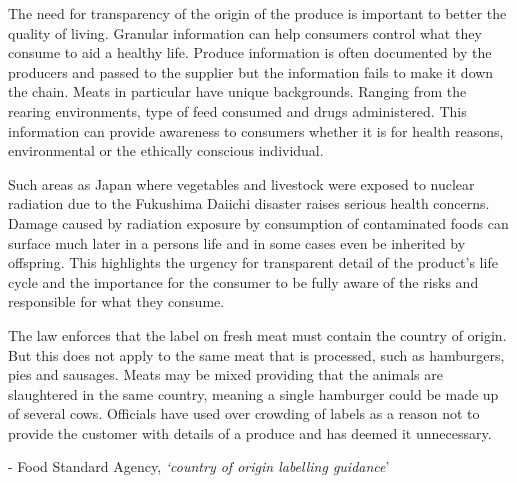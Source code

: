 \documentclass[a4paper, 11pt]{article}
\begin{document}
The need for transparency of the origin of the produce is important to better the quality of living. Granular information can help consumers control what they consume to aid a healthy life. Produce information is often documented by the producers and passed to the supplier but the information fails to make it down the chain.\cite{FSA} Meats in particular have unique backgrounds. Ranging from the rearing environments, type of feed consumed and drugs administered. This information can provide awareness to consumers whether it is for health reasons, environmental or the ethically conscious individual.

Such areas as Japan where vegetables and livestock were exposed to nuclear radiation due to the Fukushima Daiichi disaster raises serious health concerns. Damage caused by radiation exposure by consumption of contaminated foods can surface much later in a persons life and in some cases even be inherited by offspring. This highlights the urgency for transparent detail of the product's life cycle and the importance for the consumer to be fully aware of the risks and responsible for what they consume.\cite{fukushima}

The law enforces that the label on fresh meat must contain the country of origin. But this does not apply to the same meat that is processed, such as hamburgers, pies and sausages. Meats may be mixed providing that the animals are slaughtered in the same country, meaning a single hamburger could be made up of several cows.\cite{FSA} Officials have used over crowding of labels as a reason not to provide the customer with details of a produce and has deemed it unnecessary. 

\vspace{\baselineskip}
\begin{quoting}
- Food Standard Agency, \emph{`country of origin labelling guidance}'\cite{FSA}
\end{quoting}
\vspace{\baselineskip}
\end{document}

